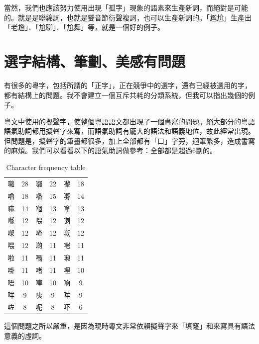 \documentclass[a5paper, 12pt, openany]{book} %
\begin{document}
當然，我們也應該努力使用出現「孤字」現象的語素來生產新詞，而絕對是可能的。就是是聯綿詞，也就是雙音節衍聲複詞，也可以生產新詞的。「尷尬」生產出「老尷」、「尬聊」、「尬舞」等，就是一個好的例子。

\section{選字結構、筆劃、美感有問題}

有很多的粵字，包括所謂的「正字」，正在競爭中的選字，還有已經被選用的字，都有結構上的問題。我不會建立一個互斥共耗的分類系統，但我可以指出幾個的例子。

粵文中使用的擬聲字，使整個粵語語文都出現了一個書寫的問題。絕大部分的粵語語氣助詞都用擬聲字來寫，而語氣助詞有龐大的語法和語義地位，故此經常出現。但問題是，擬聲字的筆畫都很多，加上全部都有「口」字旁，迴筆繁多，造成書寫的麻煩。我們可以看看以下的語氣助詞做參考：全部都是超過6劃的。 


\begin{table}[H]
  \centering
  \begin{tabular}{l c l c l c}
  囖 & 28 & 囉 & 22 & 嚟 & 18 \\
  嚕 & 18 & 噃 & 15 & 嘢 & 14 \\
  嘛 & 14 & 嗰 & 13 & 嗱 & 13 \\
  喺 & 12 & 喂 & 12 & 喇 & 12 \\
  㗎 & 12 & 喳 & 12 & 嘅 & 12 \\
  喂 & 12 & 啲 & 11 & 啱 & 11 \\
  啦 & 11 & 喎 & 11 & 啝 & 11 \\
  啩 & 11 & 啫 & 11 & 哩 & 10 \\
  唔 & 10 & 唓 & 10 & 响 & 9 \\
  咩 & 9 & 咦 & 9 & 咩 & 9 \\
  咗 & 8 & 呢 & 8 & 吓 & 6 \\
  \end{tabular}
  \caption{Character frequency table}
\end{table}

這個問題之所以嚴重，是因為現時粵文非常依賴擬聲字來「填窿」和來寫具有語法意義的虛詞。
\end{document}
